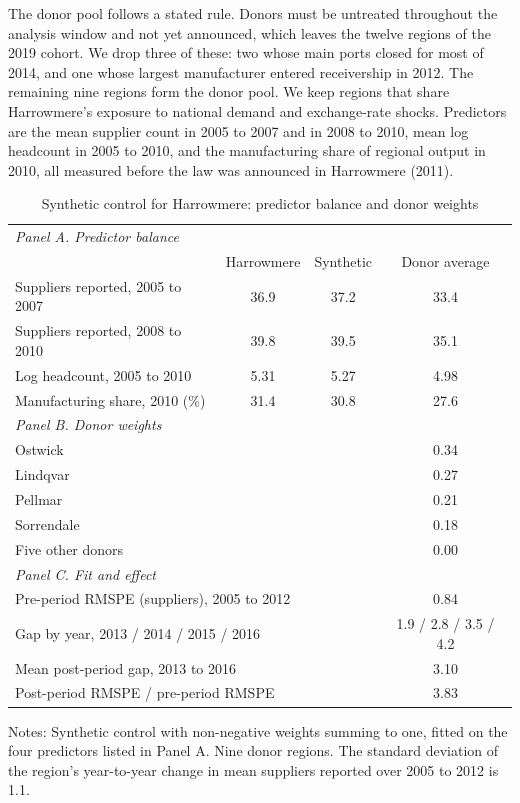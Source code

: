 \documentclass[11pt]{article}
\begin{document}
The donor pool follows a stated rule. Donors must be untreated throughout the analysis window and not yet announced, which leaves the twelve regions of the 2019 cohort. We drop three of these: two whose main ports closed for most of 2014, and one whose largest manufacturer entered receivership in 2012. The remaining nine regions form the donor pool. We keep regions that share Harrowmere's exposure to national demand and exchange-rate shocks. Predictors are the mean supplier count in 2005 to 2007 and in 2008 to 2010, mean log headcount in 2005 to 2010, and the manufacturing share of regional output in 2010, all measured before the law was announced in Harrowmere (2011).

\begin{table}[ht]
\centering
\begin{threeparttable}
\caption{Synthetic control for Harrowmere: predictor balance and donor weights}
\label{tab:sc}
\small
\begin{tabular}{lccc}
\toprule
\multicolumn{4}{l}{\textit{Panel A. Predictor balance}} \\
 & Harrowmere & Synthetic & Donor average \\
\midrule
Suppliers reported, 2005 to 2007 & 36.9 & 37.2 & 33.4 \\
Suppliers reported, 2008 to 2010 & 39.8 & 39.5 & 35.1 \\
Log headcount, 2005 to 2010 & 5.31 & 5.27 & 4.98 \\
Manufacturing share, 2010 (\%) & 31.4 & 30.8 & 27.6 \\
\midrule
\multicolumn{4}{l}{\textit{Panel B. Donor weights}} \\
\multicolumn{3}{l}{Ostwick} & 0.34 \\
\multicolumn{3}{l}{Lindqvar} & 0.27 \\
\multicolumn{3}{l}{Pellmar} & 0.21 \\
\multicolumn{3}{l}{Sorrendale} & 0.18 \\
\multicolumn{3}{l}{Five other donors} & 0.00 \\
\midrule
\multicolumn{4}{l}{\textit{Panel C. Fit and effect}} \\
\multicolumn{3}{l}{Pre-period RMSPE (suppliers), 2005 to 2012} & 0.84 \\
\multicolumn{3}{l}{Gap by year, 2013 / 2014 / 2015 / 2016} & 1.9 / 2.8 / 3.5 / 4.2 \\
\multicolumn{3}{l}{Mean post-period gap, 2013 to 2016} & 3.10 \\
\multicolumn{3}{l}{Post-period RMSPE / pre-period RMSPE} & 3.83 \\
\bottomrule
\end{tabular}
\begin{tablenotes}\footnotesize
\item Notes: Synthetic control with non-negative weights summing to one, fitted on the four predictors listed in Panel A. Nine donor regions. The standard deviation of the region's year-to-year change in mean suppliers reported over 2005 to 2012 is 1.1.
\end{tablenotes}
\end{threeparttable}
\end{table}
\end{document}
